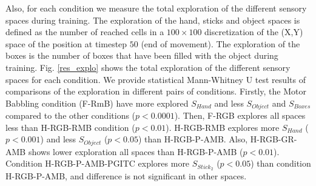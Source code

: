 \documentclass[10pt,letterpaper]{article}
\begin{document}

	Also, for each condition we measure the total exploration of the different sensory spaces during training. 
	The exploration of the hand, sticks and object spaces is defined as the number of reached cells 
	in a $100\times100$ discretization of the (X,Y) space of the position at timestep $50$ (end of movement).
	The exploration of the boxes is the number of boxes that have been filled with the object during training.
	Fig. \ref{res_explo} shows the total exploration of the different sensory spaces for each condition.
	We provide statistical Mann-Whitney U test results of comparisons of the exploration in different pairs of conditions.
	Firstly, the Motor Babbling condition (F-RmB) have more explored $S_{Hand}$ and less $S_{Object}$ and $S_{Boxes}$ compared to the other conditions ($p<0.0001$).
	Then, F-RGB explores all spaces less than H-RGB-RMB condition ($p<0.01$).
	H-RGB-RMB explores more $S_{Hand}$ ($p<0.001$) and less $S_{Object}$ ($p<0.05$) than H-RGB-P-AMB.
	Also, H-RGB-GR-AMB shows lower exploration all spaces than H-RGB-P-AMB ($p<0.01$).
	Condition H-RGB-P-AMB-PGITC explores more $S_{Stick_2}$ ($p<0.05$) than condition H-RGB-P-AMB, and difference is not significant in other spaces.
	
\end{document}
